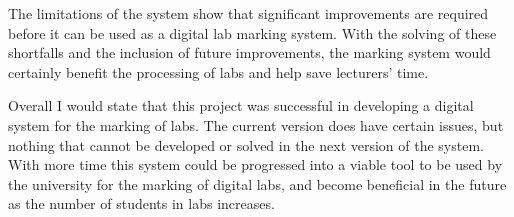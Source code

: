 \documentclass[11pt]{report}
\begin{document}
The limitations of the system  show that significant improvements are required before it can be used as a digital lab marking system. With the solving of these shortfalls and the inclusion of future improvements, the marking system would certainly benefit the processing of labs and help save lecturers' time.   

Overall I would state that this project was successful in developing a digital system for the marking of labs. The current version does have certain issues, but nothing that cannot be developed or solved in the next version of the system. With more time this system could be progressed into a viable tool to be used by the university for the marking of digital labs, and become beneficial in the future as the number of students in labs increases. 





\newpage






\let\cleardoublepage\clearpage


\end{document}
